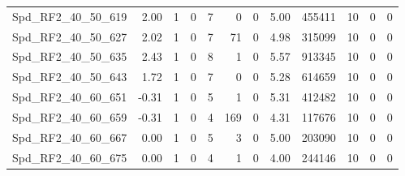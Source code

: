 \begin{longtable}[c]{@{}lrrrrrrrrrrr@{}}
Spd\_RF2\_40\_50\_619        & 2.00                   & 1                       & 0                       & 7                      & 0                       & 0                       & 5.00                    & 455411                   & 10                       & 0                        & 0                        \\
Spd\_RF2\_40\_50\_627        & 2.02                   & 1                       & 0                       & 7                      & 71                      & 0                       & 4.98                    & 315099                   & 10                       & 0                        & 0                        \\
Spd\_RF2\_40\_50\_635        & 2.43                   & 1                       & 0                       & 8                      & 1                       & 0                       & 5.57                    & 913345                   & 10                       & 0                        & 0                        \\
Spd\_RF2\_40\_50\_643        & 1.72                   & 1                       & 0                       & 7                      & 0                       & 0                       & 5.28                    & 614659                   & 10                       & 0                        & 0                        \\
Spd\_RF2\_40\_60\_651        & -0.31                  & 1                       & 0                       & 5                      & 1                       & 0                       & 5.31                    & 412482                   & 10                       & 0                        & 0                        \\
Spd\_RF2\_40\_60\_659        & -0.31                  & 1                       & 0                       & 4                      & 169                     & 0                       & 4.31                    & 117676                   & 10                       & 0                        & 0                        \\
Spd\_RF2\_40\_60\_667        & 0.00                   & 1                       & 0                       & 5                      & 3                       & 0                       & 5.00                    & 203090                   & 10                       & 0                        & 0                        \\
Spd\_RF2\_40\_60\_675        & 0.00                   & 1                       & 0                       & 4                      & 1                       & 0                       & 4.00                    & 244146                   & 10                       & 0                        & 0                        \\

\end{longtable}
